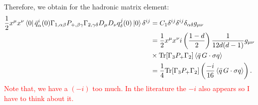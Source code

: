 \documentclass[openright,twoside,12pt,a4paper,final]{article}
\begin{document}
    Therefore, we obtain for the hadronic matrix element:
    \begin{align}
        \frac{1}{2} x^{\mu} x^{\nu} \bra{0}\bar{q}^{i}_{\alpha}(0) \Gamma_{1, \alpha \beta} P_{+, \beta \gamma} \Gamma_{2, \gamma \delta} D_{\mu} D_{\nu} q^{j}_{\delta}(0) \ket{0} \delta^{ij} &= C_{1} \delta^{ij} \delta^{ij} \delta_{\alpha \delta} g_{\mu \nu} \nonumber \\
        &=  \frac{1}{2} x^{\mu} x^{\nu} i \left(\frac{1-d}{2} \right) \frac{1}{12 d (d-1)} g_{\mu \nu} \nonumber \\
        & \times \text{Tr}[\Gamma_{3} P_{+} \Gamma_{2}] \braket{\bar{q} \, G \cdot \sigma q} \nonumber \\
        &= \frac{1}{4} \text{Tr}[\Gamma_{3} P_{+} \Gamma_{2}] \left(\frac{-i}{16} \braket{\bar{q} \, G \cdot \sigma q} \right).
    \end{align}
    \textcolor{red}{Note that, we have a $(-i)$ too much. In the literature the $-i$ also appears so I have to think about it.}
    
\end{document}
